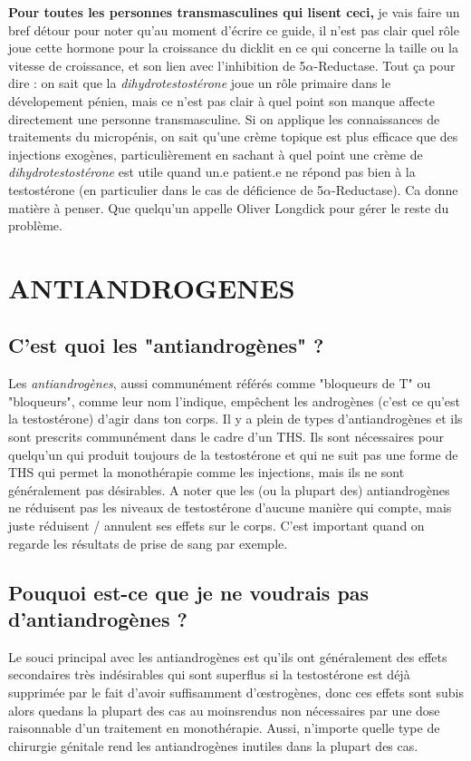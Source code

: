 \documentclass{article}
\begin{document}
\textbf{Pour toutes les personnes transmasculines qui lisent ceci,} je vais faire un bref détour pour noter qu'au moment d'écrire ce guide, il n'est pas clair quel rôle joue cette hormone pour la croissance du dicklit en ce qui concerne la taille ou la vitesse de croissance, et son lien avec l'inhibition de 5$\alpha$-Reductase. Tout ça pour dire : on sait que la \textit{dihydrotestostérone }joue un rôle primaire dans le dévelopement pénien, mais ce n'est pas clair à quel point son manque affecte directement une personne transmasculine. Si on applique les connaissances de traitements du micropénis, on sait qu'une crème topique est plus efficace que des injections exogènes, particulièrement en sachant à quel point une crème de \textit{dihydrotestostérone} est utile quand un.e patient.e ne répond pas bien à la testostérone (en particulier dans le cas de déficience de 5$\alpha$-Reductase). Ca donne matière à penser. Que quelqu'un appelle Oliver Longdick pour gérer le reste du problème.

\section{ANTIANDROGENES}\label{AA}

\subsection{C'est quoi les "antiandrogènes" ?}

Les \textit{antiandrogènes}, aussi communément référés comme "bloqueurs de T" ou "bloqueurs", comme leur nom l'indique, empêchent les androgènes (c'est ce qu'est la testostérone) d'agir dans ton corps. Il y a plein de types d'antiandrogènes et ils sont prescrits communément dans le cadre d'un THS. Ils sont nécessaires pour quelqu'un qui produit toujours de la testostérone et qui ne suit pas une forme de THS qui permet la monothérapie comme les injections, mais ils ne sont généralement pas désirables. A noter que les (ou la plupart des) antiandrogènes ne réduisent pas les niveaux de testostérone d'aucune manière qui compte, mais juste réduisent / annulent ses effets sur le corps. C'est important quand on regarde les résultats de prise de sang par exemple.

\subsection{Pouquoi est-ce que je ne voudrais pas d'antiandrogènes ?}

Le souci principal avec les antiandrogènes est qu'ils ont généralement des effets secondaires très indésirables qui sont superflus si la testostérone est déjà supprimée par le fait d'avoir suffisamment d'œstrogènes, donc ces effets sont subis alors que\textemdash{}dans la plupart des cas au moins\textemdash{}rendus non nécessaires par une dose raisonnable d'un traitement en monothérapie. Aussi, n'importe quelle type de chirurgie génitale rend les antiandrogènes inutiles dans la plupart des cas.
\end{document}
